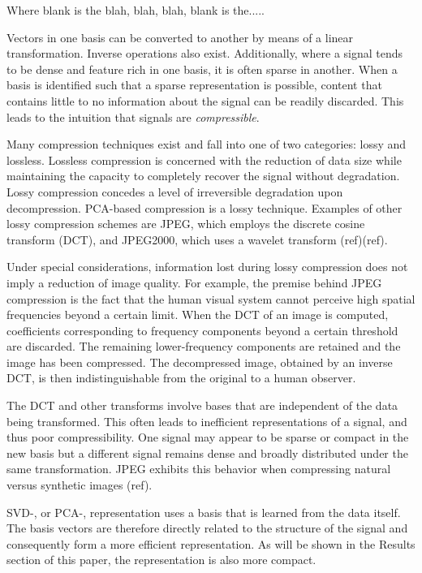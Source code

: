\documentclass[conference]{IEEEtran}
\begin{document}

    Where blank is the blah, blah, blah, blank is the.....

    Vectors in one basis can be converted to another by means of a linear transformation. Inverse operations also exist. Additionally, where a signal tends to be dense and feature rich in one basis, it is often sparse in another. When a basis is identified such that a sparse representation is possible, content that contains little to no information about the signal can be readily discarded. This leads to the intuition that signals are \textit{compressible}.

    Many compression techniques exist and fall into one of two categories: lossy and lossless. Lossless compression is concerned with the reduction of data size while maintaining the capacity to  completely recover the signal without degradation. Lossy compression concedes a level of irreversible degradation upon decompression. PCA-based compression is a lossy technique. Examples of other lossy compression schemes are JPEG, which employs the discrete cosine transform (DCT), and JPEG2000, which uses a wavelet transform (ref)(ref).
    
    Under special considerations, information lost during lossy compression does not imply a reduction of image quality. For example, the premise behind JPEG compression is the fact that the human visual 
    system cannot perceive high spatial frequencies beyond a certain limit. When the DCT of an image is computed, coefficients corresponding to frequency components beyond a certain threshold are discarded. The remaining lower-frequency components are retained and the image has been compressed. The decompressed image, obtained by an inverse DCT, is then indistinguishable from the original to a human observer.

    The DCT and other transforms involve bases that are independent of the data being transformed. This often leads to inefficient representations of a signal, and thus poor compressibility. One signal may appear to be sparse or compact in the new basis but a different signal remains dense and broadly distributed under the same transformation. JPEG exhibits this behavior when compressing natural versus synthetic images (ref).
    
    SVD-, or PCA-, representation uses a basis that is learned from the data itself. The basis vectors are therefore directly related to the structure of the signal and consequently form a more efficient representation. As will be shown in the Results section of this paper, the representation is also more compact.
    
\end{document}
